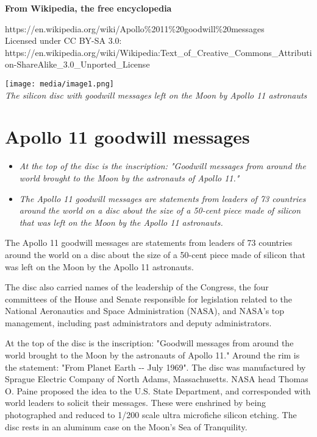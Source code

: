\textbf{From Wikipedia, the free encyclopedia}

https://en.wikipedia.org/wiki/Apollo\%2011\%20goodwill\%20messages\\
Licensed under CC BY-SA 3.0:\\
https://en.wikipedia.org/wiki/Wikipedia:Text\_of\_Creative\_Commons\_Attribution-ShareAlike\_3.0\_Unported\_License

\texttt{[image: media/image1.png]}\\
\emph{The silicon disc with goodwill messages left on the Moon by Apollo
11 astronauts}

\section{Apollo 11 goodwill messages}\label{apollo-11-goodwill-messages}

\begin{itemize}
\item
  \emph{At the top of the disc is the inscription: "Goodwill messages
  from around the world brought to the Moon by the astronauts of Apollo
  11."}
\item
  \emph{The Apollo 11 goodwill messages are statements from leaders of
  73 countries around the world on a disc about the size of a 50-cent
  piece made of silicon that was left on the Moon by the Apollo 11
  astronauts.}
\end{itemize}

The Apollo 11 goodwill messages are statements from leaders of 73
countries around the world on a disc about the size of a 50-cent piece
made of silicon that was left on the Moon by the Apollo 11 astronauts.

The disc also carried names of the leadership of the Congress, the four
committees of the House and Senate responsible for legislation related
to the National Aeronautics and Space Administration (NASA), and NASA's
top management, including past administrators and deputy administrators.

At the top of the disc is the inscription: "Goodwill messages from
around the world brought to the Moon by the astronauts of Apollo 11."
Around the rim is the statement: "From Planet Earth -\/- July 1969". The
disc was manufactured by Sprague Electric Company of North Adams,
Massachusetts. NASA head Thomas O. Paine proposed the idea to the U.S.
State Department, and corresponded with world leaders to solicit their
messages. These were enshrined by being photographed and reduced to
1/200 scale ultra microfiche silicon etching. The disc rests in an
aluminum case on the Moon's Sea of Tranquility.

